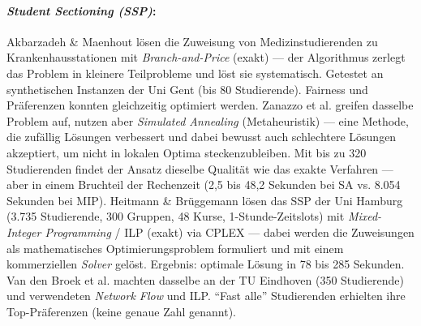 \paragraph{\textit{Student Sectioning (SSP)}:}

Akbarzadeh \& Maenhout \cite{v-akbarzadeh2021exact} lösen die Zuweisung von Medizinstudierenden zu Krankenhausstationen mit \textit{Branch-and-Price} (exakt) --- der Algorithmus zerlegt das Problem in kleinere Teilprobleme und löst sie systematisch. Getestet an synthetischen Instanzen der Uni Gent (bis 80 Studierende). Fairness und Präferenzen konnten gleichzeitig optimiert werden. Zanazzo et al. \cite{v-zanazzo2025solving} greifen dasselbe Problem auf, nutzen aber \textit{Simulated Annealing} (Metaheuristik) --- eine Methode, die zufällig Lösungen verbessert und dabei bewusst auch schlechtere Lösungen akzeptiert, um nicht in lokalen Optima steckenzubleiben. Mit bis zu 320 Studierenden findet der Ansatz dieselbe Qualität wie das exakte Verfahren --- aber in einem Bruchteil der Rechenzeit (2,5 bis 48,2 Sekunden bei SA vs. 8.054 Sekunden bei MIP).
Heitmann \& Brüggemann \cite{v-heitmann2014preference} lösen das SSP der Uni Hamburg (3.735 Studierende, 300 Gruppen, 48 Kurse, 1-Stunde-Zeitslots) mit \textit{Mixed-Integer Programming} / ILP (exakt) via CPLEX --- dabei werden die Zuweisungen als mathematisches Optimierungsproblem formuliert und mit einem kommerziellen \textit{Solver} gelöst. Ergebnis: optimale Lösung in 78 bis 285 Sekunden. Van den Broek et al. \cite{v-van2009timetabling} machten dasselbe an der TU Eindhoven (350 Studierende) und verwendeten \textit{Network Flow} und ILP. \enquote{Fast alle} Studierenden erhielten ihre Top-Präferenzen (keine genaue Zahl genannt).

